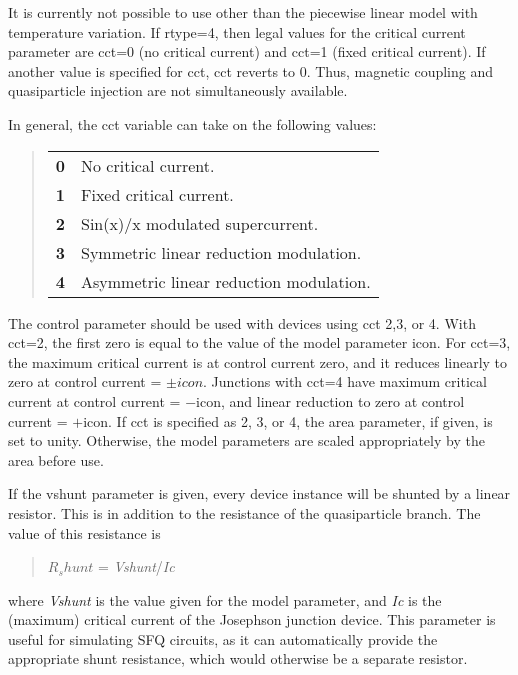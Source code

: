 It is currently not possible to use other than the piecewise linear
model with temperature variation.  If {\vt rtype=4}, then legal values
for the critical current parameter are {\vt cct=0} (no critical
current) and {\vt cct=1} (fixed critical current).  If another value
is specified for {\vt cct}, {\vt cct} reverts to 0.  Thus, magnetic
coupling and quasiparticle injection are not simultaneously available.

In general, the {\vt cct} variable can take on the following values:
\begin{quote}
\begin{tabular}{ll}
\bf 0 & No critical current.\\
\bf 1 & Fixed critical current.\\
\bf 2 & Sin(x)/x modulated supercurrent.\\
\bf 3 & Symmetric linear reduction modulation.\\
\bf 4 & Asymmetric linear reduction modulation.\\
\end{tabular}
\end{quote}

The {\vt control} parameter should be used with devices using {\vt
cct} 2,3, or 4.  With {\vt cct=2}, the first zero is equal to the
value of the model parameter {\vt icon}.  For {\vt cct=3}, the maximum
critical current is at control current zero, and it reduces linearly
to zero at control current = $\pm icon$.  Junctions with {\vt cct=4}
have maximum critical current at control current = $-${\vt icon}, and
linear reduction to zero at control current = $+${\vt icon}.  If {\vt
cct} is specified as 2, 3, or 4, the area parameter, if given, is set
to unity.  Otherwise, the model parameters are scaled appropriately by
the area before use.

If the {\vt vshunt} parameter is given, every device instance will be
shunted by a linear resistor.  This is in addition to the resistance
of the quasiparticle branch.  The value of this resistance is
\begin{quote}
$R_shunt$ = {\it Vshunt\/}/{\it Ic}
\end{quote}
where {\it Vshunt} is the value given for the model parameter, and
{\it Ic} is the (maximum) critical current of the Josephson junction
device.  This parameter is useful for simulating SFQ circuits, as it
can automatically provide the appropriate shunt resistance, which
would otherwise be a separate resistor.

